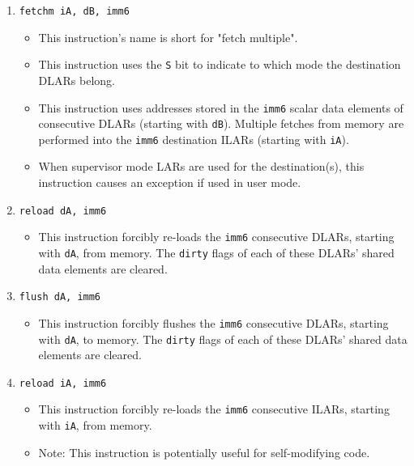 \documentclass{article}
\begin{document}
\begin{itemize}
\begin{enumerate}
			\item \texttt{fetchm iA, dB, imm6}
				\begin{itemize}
				\item This instruction's name is short for "fetch
					multiple".
				\item This instruction uses the \texttt{S} bit to indicate
					to which mode the destination DLARs belong.
				\item This instruction uses addresses stored in the
					\texttt{imm6} scalar data elements of consecutive DLARs
					(starting with \texttt{dB}). Multiple fetches from
					memory are performed into the \texttt{imm6} destination
					ILARs (starting with \texttt{iA}).
				\item When supervisor mode LARs are used for the
					destination(s), this instruction causes an exception if
					used in user mode.
				\end{itemize}
			\item \texttt{reload dA, imm6}
				\begin{itemize}
				\item This instruction forcibly re-loads the \texttt{imm6}
					consecutive DLARs, starting with \texttt{dA}, from
					memory. The \texttt{dirty} flags of each of these
					DLARs' shared data elements are cleared.
				\end{itemize}
			\item \texttt{flush dA, imm6}
				\begin{itemize}
				\item This instruction forcibly flushes the \texttt{imm6}
					consecutive DLARs, starting with \texttt{dA}, to
					memory. The \texttt{dirty} flags of each of these
					DLARs' shared data elements are cleared.
				\end{itemize}
			\item \texttt{reload iA, imm6}
				\begin{itemize}
				\item This instruction forcibly re-loads the \texttt{imm6}
					consecutive ILARs, starting with \texttt{iA}, from
					memory.
				\item Note: This instruction is potentially useful for
					self-modifying code.
				\end{itemize}
			\end{enumerate}
		\end{itemize}
		\newpage
\end{document}
